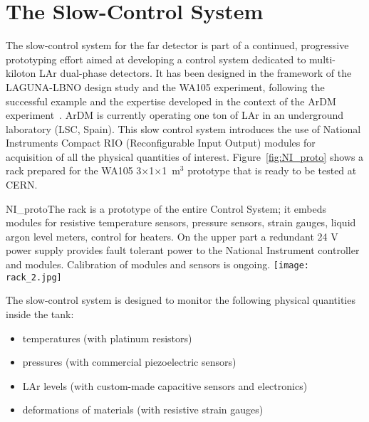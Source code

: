 \section{The Slow-Control System} 
\label{sec:detectors-fd-alt-dcs}

The slow-control system for the far detector is part of a continued,
progressive prototyping effort aimed at developing a control system
dedicated to multi-kiloton LAr dual-phase detectors. It has
been designed in the framework of the LAGUNA-LBNO design study and 
the WA105 experiment, following the successful example and the
expertise developed in the context of the ArDM
experiment~\cite{Badertscher:2013ygt}. ArDM is currently operating one
ton of LAr  in an underground laboratory (LSC, Spain). This 
slow control system introduces %
the use of
National Instruments Compact RIO (Reconfigurable Input Output) modules
for acquisition of all the physical quantities of interest. 
Figure~\ref{fig:NI_proto} shows a rack prepared for the WA105
3$\times$1$\times$1~m$^3$ prototype that is ready to be tested at CERN.

\begin{cdrfigure}{NI_proto}{The rack is a 
prototype of the entire Control System; it  embeds modules for resistive 
temperature sensors, pressure  sensors, strain gauges, liquid argon level 
meters, control for  heaters. On the upper part a redundant 24 V power supply 
provides fault tolerant power to the National Instrument controller and modules. 
Calibration of modules and sensors is ongoing.}
\texttt{[image: rack\_2.jpg]}
\end{cdrfigure}

The slow-control system %
is designed to monitor
the following physical quantities inside the tank:
\begin{itemize}
 \item temperatures (with platinum resistors)
 \item pressures (with commercial piezoelectric sensors)
 \item LAr levels (with custom-made capacitive sensors and electronics)
 \item deformations of materials (with resistive strain gauges)
\end{itemize} 

